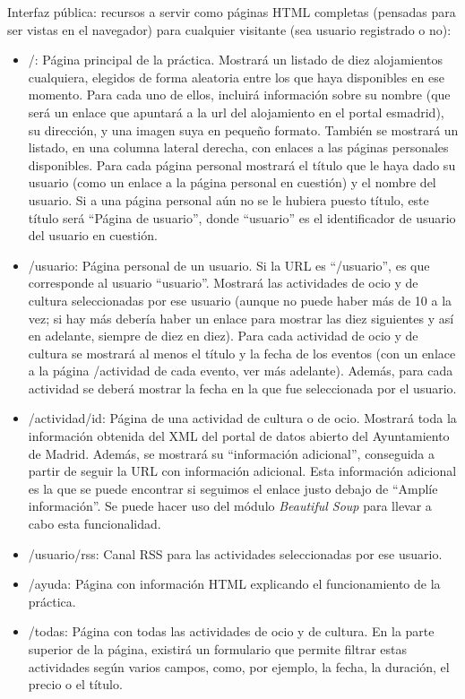 Interfaz pública: recursos a servir como páginas HTML completas (pensadas para ser vistas en el navegador) para cualquier visitante (sea usuario registrado o no):

\begin{itemize}
\item /: Página principal de la práctica. Mostrará un listado de diez alojamientos cualquiera, elegidos de forma aleatoria entre los que haya disponibles en ese momento. Para cada uno de ellos, incluirá información sobre su nombre (que será un enlace que apuntará a la url del alojamiento en el portal esmadrid), su dirección, y una imagen suya en pequeño formato. También se mostrará un listado, en una columna lateral derecha, con enlaces a las páginas personales disponibles. Para cada página personal mostrará el título que le haya dado su usuario (como un enlace a la página personal en cuestión) y el nombre del usuario. Si a una página personal aún no se le hubiera puesto título, este título será ``Página de usuario'', donde ``usuario'' es el identificador de usuario del usuario en cuestión.

\item /usuario: Página personal de un usuario. Si la URL es ``/usuario'', es que corresponde al usuario ``usuario''. Mostrará las actividades de ocio y de cultura seleccionadas por ese usuario (aunque no puede haber más de 10 a la vez; si hay más debería haber un enlace para mostrar las diez siguientes y así en adelante, siempre de diez en diez). Para cada actividad de ocio y de cultura se mostrará al menos el título y la fecha de los eventos (con un enlace a la página /actividad de cada evento, ver más adelante). Además, para cada actividad se deberá mostrar la fecha en la que fue seleccionada por el usuario.

\item /actividad/{id}: Página de una actividad de cultura o de ocio. Mostrará toda la información obtenida del XML del portal de datos abierto del Ayuntamiento de Madrid. Además, se mostrará su ``información adicional'', conseguida a partir de seguir la URL con información adicional. Esta información adicional es la que se puede encontrar si seguimos el enlace justo debajo de ``Amplíe información''. Se puede hacer uso del módulo \emph{Beautiful Soup} para llevar a cabo esta funcionalidad.

\item /usuario/rss: Canal RSS para las actividades seleccionadas por ese usuario.

\item /ayuda: Página con información HTML explicando el funcionamiento de la práctica.

\item /todas: Página con todas las actividades de ocio y de cultura. En la parte superior de la página, existirá un formulario que permite filtrar estas actividades según varios campos, como, por ejemplo, la fecha, la duración, el precio o el título.
\end{itemize}

